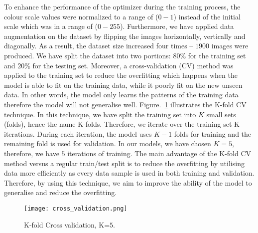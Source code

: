 To enhance the performance of the optimizer during the training process, the colour scale values were normalized to a range of (\(0-1\)) instead of the initial scale which was in a range of (\(0 - 255\)).	
Furthermore, we have applied data augmentation on the dataset by flipping the images horizontally, vertically and diagonally. 
As a result, the dataset size increased four times -- \(1900\)  images were produced.
We have split the dataset into two portions:  \(80\%\) for the training set and \(20\%\) for the testing set.
Moreover, a cross-validation (CV) method was applied to the training set to reduce the overfitting which happens when the model is able to fit on the training data, while it poorly fit on the new unseen data.
In other words, the model only learns the patterns of the training data therefore the model will not generalise well. 
Figure.~\ref{fig:Cross_validation} illustrates the K-fold CV technique.
In this technique, we have split the training set into \(K\) small sets (folds), hence the name K-folds. 
Therefore, we iterate over the training set K iterations.
During each iteration, the model uses  \(K-1\) folds for training and the remaining fold is used for validation. 
In our models, we have chosen \(K=5\), therefore, we have \(5\) iterations of training. 
The main advantage of the K-fold CV method versus a regular train/test split is to reduce the overfitting by utilising data more efficiently as every data sample is used in both training and validation. 
Therefore, by using this technique, we aim to improve the ability of the model to generalise and reduce the overfitting.
\begin{figure}
	\centering
	\texttt{[image: cross\_validation.png]}
	\caption{K-fold Cross validation, K=\(5\).}
	\label{fig:Cross_validation}
\end{figure}
